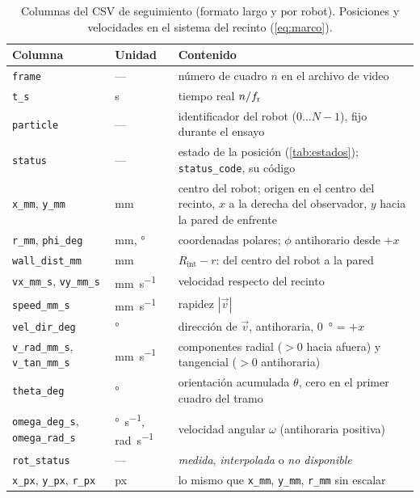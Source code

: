 \begin{table}[H]
  \centering
  \caption{Columnas del CSV de seguimiento (formato largo y por robot). Posiciones y velocidades en el
    sistema del recinto (\cref{eq:marco}).}
  \label{tab:columnas}
  \small
  \begin{tabular}{@{}p{3.9cm}lp{8.2cm}@{}}
    \toprule
    Columna & Unidad & Contenido \\
    \midrule
    \texttt{frame} & --- & número de cuadro $n$ en el archivo de video \\
    \texttt{t\_s} & \si{\second} & tiempo real $n/f_{\mathrm{r}}$ \\
    \texttt{particle} & --- & identificador del robot ($0\ldots N-1$), fijo durante el ensayo \\
    \texttt{status} & --- & estado de la posición (\cref{tab:estados}); \texttt{status\_code}, su código \\
    \texttt{x\_mm}, \texttt{y\_mm} & \si{\milli\metre} & centro del robot; origen en el centro del recinto, $x$ a la derecha del observador, $y$ hacia la pared de enfrente \\
    \texttt{r\_mm}, \texttt{phi\_deg} & \si{\milli\metre}, \si{\degree} & coordenadas polares; $\phi$ antihorario desde $+x$ \\
    \texttt{wall\_dist\_mm} & \si{\milli\metre} & $R_{\mathrm{int}} - r$: del centro del robot a la pared \\
    \texttt{vx\_mm\_s}, \texttt{vy\_mm\_s} & \si{\milli\metre\per\second} & velocidad respecto del recinto \\
    \texttt{speed\_mm\_s} & \si{\milli\metre\per\second} & rapidez $|\vec v|$ \\
    \texttt{vel\_dir\_deg} & \si{\degree} & dirección de $\vec v$, antihoraria, \SI{0}{\degree} = $+x$ \\
    \texttt{v\_rad\_mm\_s}, \texttt{v\_tan\_mm\_s} & \si{\milli\metre\per\second} & componentes radial ($>0$ hacia afuera) y tangencial ($>0$ antihoraria) \\
    \texttt{theta\_deg} & \si{\degree} & orientación acumulada $\theta$, cero en el primer cuadro del tramo \\
    \texttt{omega\_deg\_s}, \texttt{omega\_rad\_s} & \si{\degree\per\second}, \si{\radian\per\second} & velocidad angular $\omega$ (antihoraria positiva) \\
    \texttt{rot\_status} & --- & \emph{medida}, \emph{interpolada} o \emph{no disponible} \\
    \texttt{x\_px}, \texttt{y\_px}, \texttt{r\_px} & px & lo mismo que \texttt{x\_mm}, \texttt{y\_mm}, \texttt{r\_mm} sin escalar \\

\end{tabular}
\end{table}
